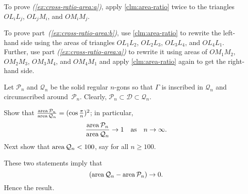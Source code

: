 \begin{multicols}{2}
To prove \textit{(\ref{ex:cross-ratio-area:a})}, apply \ref{clm:area-ratio} twice to the triangles $OL_iL_j$, $OL_jM_i$, and $OM_iM_j$.

To prove part~\textit{(\ref{ex:cross-ratio-area:b})}, use \ref{clm:area-ratio} to rewrite the left-hand side using the areas of triangles $OL_1L_2$, $OL_2L_3$, $OL_3L_4$, and $OL_4L_1$.
Further, use part \textit{(\ref{ex:cross-ratio-area:a})} to rewrite it using areas of $OM_1M_2$, $OM_2M_3$, $OM_3M_4$, and $OM_4M_1$ and apply \ref{clm:area-ratio} again to get the right-hand side.


Let $\mathcal{P}_n$ and $\mathcal{Q}_n$ be the solid regular $n$-gons
so that $\Gamma$ is inscribed in $\mathcal{Q}_n$ and circumscribed around~$\mathcal{P}_n$.
Clearly,
$\mathcal{P}_n\subset\mathcal{D}\subset\mathcal{Q}_n$.

Show that 
$\tfrac{\mathop{\rm area}\nolimits\mathcal{P}_n}{\mathop{\rm area}\nolimits\mathcal{Q}_n}=(\cos\tfrac\pi n)^2$;
in particular, 
$$\frac{\mathop{\rm area}\nolimits\mathcal{P}_n}{\mathop{\rm area}\nolimits\mathcal{Q}_n}\to 1
\quad
\text{as}
\quad
n\to\infty.$$
Next show that $\mathop{\rm area}\nolimits\mathcal{Q}_n<100$, say for all $n\ge 100$.

These two statements imply that
\[(\area\mathcal{Q}_n\z-\area\mathcal{P}_n)\to 0.\]
Hence the result.

\end{multicols}

\newpage

